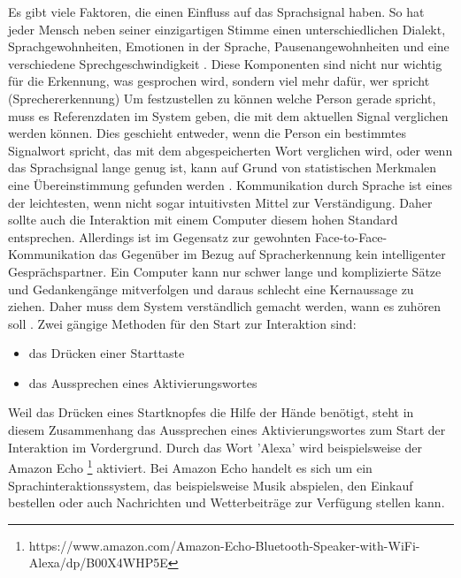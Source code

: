 \newline \newline
Es gibt viele Faktoren, die einen Einfluss auf das Sprachsignal haben. So hat jeder Mensch neben seiner einzigartigen Stimme einen unterschiedlichen Dialekt, Sprachgewohnheiten, Emotionen in der Sprache, Pausenangewohnheiten und eine verschiedene Sprechgeschwindigkeit \cite{KaufmannPfisterSprache}. Diese Komponenten sind nicht nur wichtig für die Erkennung, was gesprochen wird, sondern viel mehr dafür, wer spricht (Sprechererkennung)
\newline \newline
Um festzustellen zu können welche Person gerade spricht, muss es Referenzdaten im System geben, die mit dem aktuellen Signal verglichen werden können. Dies geschieht entweder, wenn die Person ein bestimmtes Signalwort spricht, das mit dem abgespeicherten Wort verglichen wird, oder wenn das Sprachsignal lange genug ist, kann auf Grund von statistischen Merkmalen eine Übereinstimmung gefunden werden \cite{KaufmannPfisterSprache}. 
\newline \newline
Kommunikation durch Sprache ist eines der leichtesten, wenn nicht sogar intuitivsten Mittel zur Verständigung. Daher sollte auch die Interaktion mit einem Computer diesem hohen Standard entsprechen. Allerdings ist im Gegensatz zur gewohnten Face-to-Face-Kommunikation das Gegenüber im Bezug auf Spracherkennung kein intelligenter Gesprächspartner. Ein Computer kann nur schwer lange und komplizierte Sätze und Gedankengänge mitverfolgen und daraus schlecht eine Kernaussage zu ziehen. Daher muss dem System verständlich gemacht werden, wann es zuhören soll \cite{SpeechInteraction}.
Zwei gängige Methoden für den Start zur Interaktion sind:
\begin{itemize}
      \item das Drücken einer Starttaste
      \item das Aussprechen eines Aktivierungswortes
\end{itemize}
\vspace{\baselineskip}
Weil das Drücken eines Startknopfes die Hilfe der Hände benötigt, steht in diesem Zusammenhang das Aussprechen eines Aktivierungswortes zum Start der Interaktion im Vordergrund.
Durch das Wort 'Alexa' wird beispielsweise der Amazon Echo %
\footnote{https://www.amazon.com/Amazon-Echo-Bluetooth-Speaker-with-WiFi-Alexa/dp/B00X4WHP5E}
%
aktiviert. Bei Amazon Echo handelt es sich um ein Sprachinteraktionssystem, das beispielsweise Musik abspielen, den Einkauf bestellen oder auch Nachrichten und Wetterbeiträge zur Verfügung stellen kann.
